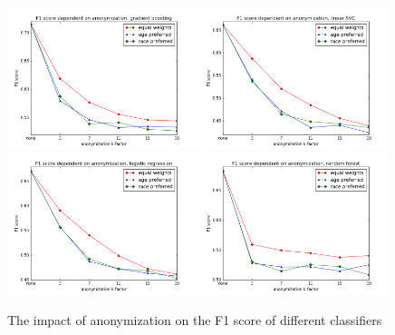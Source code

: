 \documentclass{llncs}
\begin{document}
\begin{figure}[!t]
	\begin{center}
		\includegraphics[width=0.49\textwidth]{figures/results/anon_gradient_boost}
		\includegraphics[width=0.49\textwidth]{figures/results/anon_linear_svc}
		\includegraphics[width=0.49\textwidth]{figures/results/anon_logistic_regression}
		\includegraphics[width=0.49\textwidth]{figures/results/anon_random_forest}
		\caption{The impact of anonymization on the F1 score of different classifiers}
		\label{fig:adult_results_anonymization}
	\end{center}
\end{figure}
\end{document}
